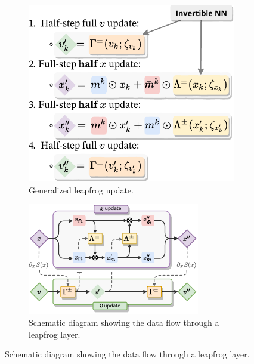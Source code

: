 \documentclass[a4paper,11pt]{article}
\begin{document}
\begin{figure}
    \centering
    \begin{subfigure}[b]{0.4\textwidth}
        \includegraphics[width=\textwidth]{assets/update_steps.pdf}
        \caption{\label{subfig:updates}Generalized leapfrog update.}
    \end{subfigure}
    \hfill
    \begin{subfigure}[b]{0.58\textwidth}
        \includegraphics[width=\textwidth]{assets/leapfrog_layer.pdf}
        \caption{\label{subfig:lfupdate}Schematic diagram showing the data flow
        through a leapfrog layer.}
    \end{subfigure}
    \vspace{1em}

\end{figure}
\end{document}
